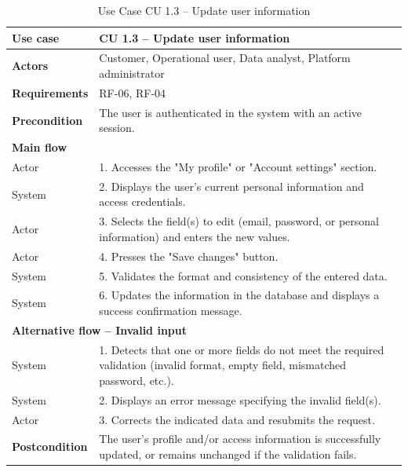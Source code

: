 \documentclass{article}
\begin{document}
\begin{table}[H]
\centering
\small
\renewcommand{\arraystretch}{1.35}
\caption{Use Case CU 1.3 -- Update user information}
\label{tab:cu1.3}
\begin{tabularx}{\textwidth}{|l|X|}
\hline
\textbf{Use case} & CU 1.3 -- Update user information \\ \hline
\textbf{Actors} & Customer, Operational user, Data analyst, Platform administrator \\ \hline
\textbf{Requirements} & RF-06, RF-04 \\ \hline
\textbf{Precondition} & The user is authenticated in the system with an active session. \\ \hline
\multicolumn{2}{|l|}{\textbf{Main flow}} \\ \hline
Actor & 1. Accesses the "My profile" or "Account settings" section. \\ \hline
System & 2. Displays the user's current personal information and access credentials. \\ \hline
Actor & 3. Selects the field(s) to edit (email, password, or personal information) and enters the new values. \\ \hline
Actor & 4. Presses the "Save changes" button. \\ \hline
System & 5. Validates the format and consistency of the entered data. \\ \hline
System & 6. Updates the information in the database and displays a success confirmation message. \\ \hline
\multicolumn{2}{|l|}{\textbf{Alternative flow -- Invalid input}} \\ \hline
System & 1. Detects that one or more fields do not meet the required validation (invalid format, empty field, mismatched password, etc.). \\ \hline
System & 2. Displays an error message specifying the invalid field(s). \\ \hline
Actor & 3. Corrects the indicated data and resubmits the request. \\ \hline
\textbf{Postcondition} & The user's profile and/or access information is successfully updated, or remains unchanged if the validation fails. \\ \hline
\end{tabularx}
\end{table}
\end{document}
